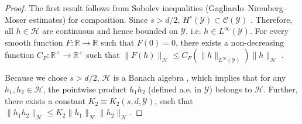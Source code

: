 \documentclass{article}
\theoremstyle{plain}
\theoremstyle{definition}
\theoremstyle{remark}
\newcommand{\R}{\mathbb{R}}
\newcommand{\cH}{\mathcal{H}}
\newcommand{\cC}{\mathcal{C}}
\newcommand{\cY}{\mathcal{Y}}
\newcommand{\1}{\mathbbm{1}}
\theoremstyle{plain}
\theoremstyle{definition}
\begin{document}
\begin{proof}
    The first result follows from Sobolev inequalities (Gagliardo–Nirenberg–Moser estimates) \citep{gagliardo1959ulteriori, nirenberg1959elliptic, moser1966rapidly} for composition. Since $s > d/2$, $H^s(\cY) \subset \cC(\cY)$ \citep[Chap.~4, Prop.~1.3]{taylor1996partial1}. Therefore, all $h \in \cH$ are continuous and hence bounded on $\cY$, i.e. $h \in L^\infty(\cY)$. For every smooth function $F: \R \to \R$ such that $F(0) = 0$, there exists a non-decreasing function $C_F: \R^+ \to \R^+$ such that $\| F(h) \|_{\cH} \leq C_F(\| h \|_{L^\infty(\cY)}) \| h \|_{\cH}$ \citep[Chap.~13, Prop.~3.9]{taylor1996partial3}.

    Because we chose $s>d/2$, $\cH$ is a Banach algebra \citep[Thm.~4.39]{adams2003sobolev}, which implies that for any $h_1, h_2 \in \cH$, the pointwise product $h_1 h_2$ (defined a.e. in $\cY$) belongs to $\cH$. Further, there exists a constant $K_2 \equiv K_2(s, d, \cY)$, such that $\| h_1 h_2 \|_\cH \leq K_2 \| h_1\|_\cH \|h_2\|_\cH$.
    

\end{proof}
\end{document}
